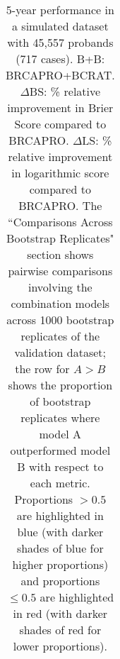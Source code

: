 \begin{table}[!htbp]
\begin{tabular}{llllll}
   \hline
\end{tabular}
\endgroup
\caption{5-year performance in a simulated dataset with 45,557 probands (717 cases). B+B: BRCAPRO+BCRAT. $\Delta$BS: \% relative improvement in Brier Score compared to BRCAPRO. $\Delta$LS: \% relative improvement in logarithmic score compared to BRCAPRO. The ``Comparisons Across Bootstrap Replicates" section shows pairwise comparisons involving the combination models across 1000 bootstrap replicates of the validation dataset; the row for $A>B$ shows the proportion of bootstrap replicates where model A outperformed model B with respect to each metric. Proportions $>0.5$ are highlighted in blue (with darker shades of blue for higher proportions) and proportions $\leq 0.5$ are highlighted in red (with darker shades of red for lower proportions).} 
\label{table:table_sim}
\end{table}
